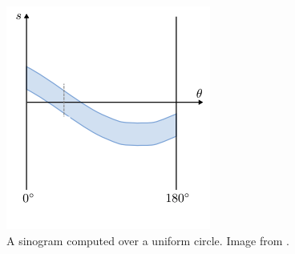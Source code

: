 \begin{figure}
	\centering
	\includegraphics[width=0.5\linewidth]{Materials/sino}
	\caption{A sinogram computed over a uniform circle. Image from \cite{MIA}.}
	\label{sino}
\end{figure}